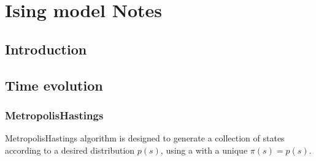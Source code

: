 \documentclass[letterpaper,10pt,english]{jupyterBook}
\begin{document}
\section{Ising model \sphinxhyphen{} Notes}
\label{\detokenize{ch/statistical-mechanics/ising-notes:ising-model-notes}}\label{\detokenize{ch/statistical-mechanics/ising-notes:statistical-mechanics-ising-notes}}\label{\detokenize{ch/statistical-mechanics/ising-notes::doc}}

\subsection{Introduction}
\label{\detokenize{ch/statistical-mechanics/ising-notes:introduction}}\label{\detokenize{ch/statistical-mechanics/ising-notes:statistical-mechanics-ising-introduction}}

\subsection{Time evolution}
\label{\detokenize{ch/statistical-mechanics/ising-notes:time-evolution}}\label{\detokenize{ch/statistical-mechanics/ising-notes:statistical-mechanics-ising-time-evolution}}

\subsubsection{Metropolis\sphinxhyphen{}Hastings}
\label{\detokenize{ch/statistical-mechanics/ising-notes:metropolis-hastings}}\label{\detokenize{ch/statistical-mechanics/ising-notes:id1}}
\sphinxAtStartPar
Metropolis\sphinxhyphen{}Hastings algorithm is designed to generate a collection of states according to a desired distribution \(p(s)\), using a  with a unique  \(\pi(s) = p(s)\).
\end{document}
